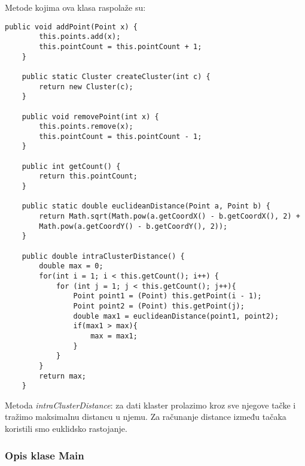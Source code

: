 \documentclass[a4paper]{article}
\begin{document}
Metode kojima ova klasa raspolaže su:

\begin{lstlisting}[title=Program 4: Klasa Cluster i njene metode]
	public void addPoint(Point x) { 
		this.points.add(x); 
		this.pointCount = this.pointCount + 1; 
	} 

	public static Cluster createCluster(int c) { 
		return new Cluster(c); 
	}

	public void removePoint(int x) { 
		this.points.remove(x); 
		this.pointCount = this.pointCount - 1; 
	} 

	public int getCount() { 
		return this.pointCount; 
	} 

	public static double euclideanDistance(Point a, Point b) { 
		return Math.sqrt(Math.pow(a.getCoordX() - b.getCoordX(), 2) + 
		Math.pow(a.getCoordY() - b.getCoordY(), 2)); 
	} 

	public double intraClusterDistance() {
		double max = 0;
		for(int i = 1; i < this.getCount(); i++) { 
			for (int j = 1; j < this.getCount(); j++){
				Point point1 = (Point) this.getPoint(i - 1);
				Point point2 = (Point) this.getPoint(j);
				double max1 = euclideanDistance(point1, point2);
				if(max1 > max){
					max = max1;
				}
			}
		}
		return max;
	} 
\end{lstlisting}

Metoda \textit{intraClusterDistance}: za dati klaster prolazimo kroz sve njegove tačke i tražimo maksimalnu distancu u njemu. Za računanje distance između tačaka koristili smo euklidsko rastojanje.


\subsubsection*{Opis klase Main}
\end{document}
